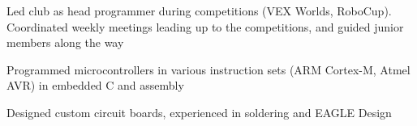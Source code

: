 
\begin{cvitemize}
  \item Led club as head programmer during competitions (VEX Worlds, RoboCup). Coordinated weekly meetings leading up to the competitions, and guided junior members along the way
  \item Programmed microcontrollers in various instruction sets (ARM Cortex-M, Atmel AVR) in embedded C and assembly
  \item Designed custom circuit boards, experienced in soldering and EAGLE Design
\end{cvitemize}